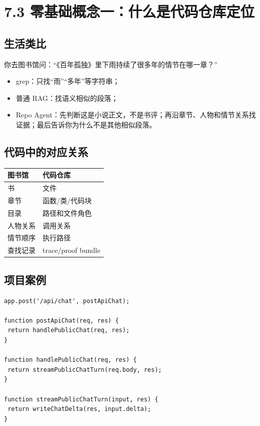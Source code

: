 \documentclass[UTF8,12pt,openany]{ctexbook}
\begin{document}
\section{7.3 零基础概念一：什么是代码仓库定位}

\subsection{生活类比}

你去图书馆问：“《百年孤独》里下雨持续了很多年的情节在哪一章？”\par

\begin{itemize}
\item grep：只找“雨”“多年”等字符串；
\item 普通 RAG：找语义相似的段落；
\item Repo Agent：先判断这是小说正文，不是书评；再沿章节、人物和情节关系找证据；最后告诉你为什么不是其他相似段落。
\end{itemize}

\subsection{代码中的对应关系}

\begin{center}
\small
\begin{longtable}{|p{}|p{}|}
\toprule
图书馆 & 代码仓库 \\
\midrule
书 & 文件 \\
章节 & 函数/类/代码块 \\
目录 & 路径和文件角色 \\
人物关系 & 调用关系 \\
情节顺序 & 执行路径 \\
查找记录 & trace/proof bundle \\
\bottomrule
\end{longtable}
\end{center}

\subsection{项目案例}

\begin{lstlisting}
app.post('/api/chat', postApiChat);

function postApiChat(req, res) {
 return handlePublicChat(req, res);
}

function handlePublicChat(req, res) {
 return streamPublicChatTurn(req.body, res);
}

function streamPublicChatTurn(input, res) {
 return writeChatDelta(res, input.delta);
}
\end{lstlisting}
\end{document}
